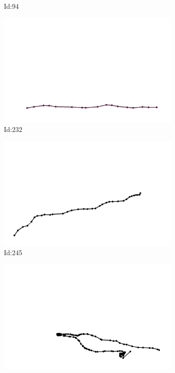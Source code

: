 \documentclass[12pt,twoside]{report}
\begin{document}
\begin{figure}
\begin{subfigure}[b]{0.20\textwidth}
\caption{Id:94}
\end{subfigure}
\begin{subfigure}[b]{0.20\textwidth}
\centering
\includegraphics[width=\textwidth]{../trajectories/232.png}
\caption{Id:232}
\end{subfigure}
\begin{subfigure}[b]{0.20\textwidth}
\centering
\includegraphics[width=\textwidth]{../trajectories/245.png}
\caption{Id:245}
\end{subfigure}
\begin{subfigure}[b]{0.20\textwidth}
\centering
\includegraphics[width=\textwidth]{../trajectories/294.png}

\end{subfigure}
\end{figure}
\end{document}
